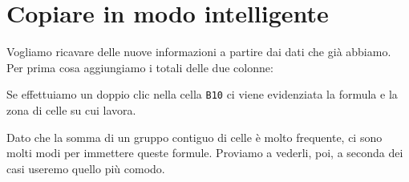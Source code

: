 \section{Copiare in modo intelligente}
\label{fogliodicalcolo:copiare-in-modo-intelligente}



Vogliamo ricavare delle nuove informazioni a partire dai dati che già 
abbiamo.
Per prima cosa aggiungiamo i totali delle due colonne:


\vspace{.5em}
\salvare

Se effettuiamo un doppio clic nella cella \texttt{B10} ci viene evidenziata 
la formula e la zona di celle su cui lavora.

Dato che la somma di un gruppo contiguo di celle è molto frequente, ci sono
molti modi per immettere queste formule. Proviamo a vederli, poi, a seconda
dei casi useremo quello più comodo. 


